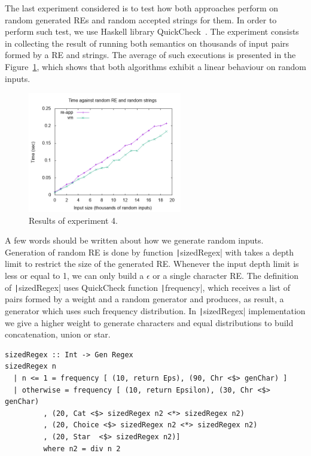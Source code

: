 \documentclass[review]{elsarticle}
\newcommand{\haskell}[1]{\texttt|#1|}
\theoremstyle{definition}
\begin{document}
The last experiment considered is to test how both approaches perform
on random generated REs and random accepted strings for them. In order to
perform such test, we use Haskell library QuickCheck~\cite{Claessen2000}.
The experiment consists in collecting the result of running both semantics 
on thousands of input pairs formed by a RE and strings. The average of such 
executions is presented in the Figure~\ref{fig:graph5}, which shows that both 
algorithms exhibit a linear behaviour  on random inputs.

\begin{figure}[h]
    \includegraphics[width=0.6\textwidth]{random.png}
   \centering
   \caption{Results of experiment 4.}
   \label{fig:graph5}
\end{figure}

A few words should be written about how we generate random inputs. 
Generation of random RE is done by function \haskell{sizedRegex} with takes a depth limit to restrict
the size of the generated RE. Whenever the input depth limit is less or equal to 1, we can
only build a $\epsilon$ or a single character RE. The definition of \haskell{sizedRegex} uses
QuickCheck function \haskell{frequency}, which receives a list of pairs formed by a weight and
a random generator and produces, as result, a generator which uses such frequency distribution.
In \haskell{sizedRegex} implementation we give a higher weight to generate characters and equal distributions
to build concatenation, union or star.

\begin{verbatim}
sizedRegex :: Int -> Gen Regex
sizedRegex n
  | n <= 1 = frequency [ (10, return Eps), (90, Chr <$> genChar) ]
  | otherwise = frequency [ (10, return Epsilon), (30, Chr <$> genChar)
         , (20, Cat <$> sizedRegex n2 <*> sizedRegex n2)
         , (20, Choice <$> sizedRegex n2 <*> sizedRegex n2)
         , (20, Star  <$> sizedRegex n2)]
         where n2 = div n 2
\end{verbatim}
\end{document}
